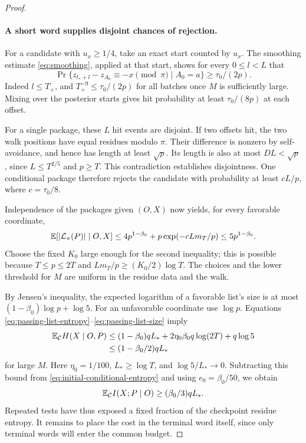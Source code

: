 \begin{proof}
\paragraph{A short word supplies disjoint chances of rejection.}
For a candidate with \(u_x\ge1/4\), take an exact start counted
by \(u_x\). The smoothing estimate \eqref{eq:smoothing}, applied
at that start, shows for every \(0\le l<L\) that
\[
 \Pr\{z_{t_*+l}-z_{A_0}\equiv-x\pmod\pi\mid A_0=a\}
 \ge\tau_0/(2p).
\]
Indeed \(l\le T_+\), and \(T_+^{-9}\le\tau_0/(2p)\) for all
batches once \(M\) is sufficiently large. Mixing over the posterior
starts gives hit probability at least \(\tau_0/(8p)\) at each
offset.

For a single package, these \(L\) hit events are disjoint. If two
offsets hit, the two walk positions have equal residues modulo
\(\pi\). Their difference is nonzero by self-avoidance, and hence
has length at least \(\sqrt p\). Its length is also at most
\(DL<\sqrt p\), since \(L\le T^{2/5}\) and \(p\ge T\).
This contradiction establishes disjointness. One conditional package
therefore rejects the candidate with probability at least
\(cL/p\), where \(c=\tau_0/8\).

Independence of the packages given \((O,X)\) now yields, for every
favorable coordinate,
\begin{equation}
 \mathbb E[|\mathcal L_\pi(P)|\mid O,X]
 \le4p^{1-\beta_0}+p\exp(-cLm_T/p)
 \le5p^{1-\beta_0}.
 \label{eq:passing-list-size}
\end{equation}
Choose the fixed \(K_0\) large enough for the second inequality;
this is possible because \(T\le p\le2T\) and
\(Lm_T/p\ge(K_0/2)\log T\). The choices and the lower threshold
for \(M\) are uniform in the residue data and the walk.

By Jensen's inequality, the expected logarithm of a favorable list's
size is at most \((1-\beta_0)\log p+\log5\). For an unfavorable
coordinate use \(\log p\). Equations
\eqref{eq:passing-list-entropy}--\eqref{eq:passing-list-size} imply
\[
 \begin{aligned}
 \mathbb E_{\mathcal C}H(X\mid O,P)
 &\le(1-\beta_0)qL_*
       +2\eta_0\beta_0q\log(2T)+q\log5\\
 &\le(1-\beta_0/2)qL_*
 \end{aligned}
\]
for large \(M\). Here \(\eta_0=1/100\),
\(L_*\ge\log T\), and \(\log5/L_*\to0\).
Subtracting this bound from \eqref{eq:initial-conditional-entropy}
and using \(e_0=\beta_0/50\), we obtain
\begin{equation}
 \mathbb E_{\mathcal C}I(X;P\mid O)\ge(\beta_0/3)qL_*.
 \label{eq:package-information-lower}
\end{equation}
Repeated tests have thus exposed a fixed fraction of the checkpoint
residue entropy. It remains to place the cost in the terminal word
itself, since only terminal words will enter the common budget.


\end{proof}
